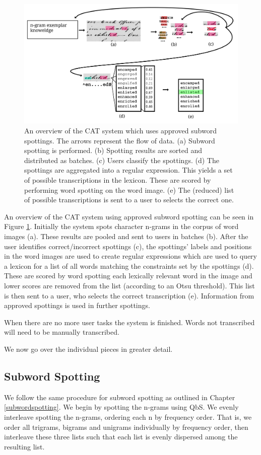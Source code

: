 \documentclass[ms,electronic,twosidetoc,letterpaper,chaptercenter,parttop,lof,lot]{byumsphd}
\begin{document}
\begin{figure}
    \centering
    \includegraphics[width=.9\textwidth]{flow6}
    \caption{An overview of the CAT system which uses approved subword spottings. The arrows represent the flow of data. (a) Subword spotting is performed. (b) Spotting results are sorted and distributed as batches. (c) Users classify the spottings. (d) The spottings are aggregated into a regular expression. This yields a set of possible transcriptions in the lexicon. These are scored by performing word spotting on the word image. (e) The (reduced) list of possible transcriptions is sent to a user to selects the correct one.}
    \label{fig:flow}
\end{figure}
An overview of the CAT system using approved subword spotting can be seen in Figure \ref{fig:flow}.  Initially the system spots character n-grams in the corpus of word images (a). These results are pooled and sent to users in batches (b). After the user identifies correct/incorrect spottings (c), the spottings' labels and positions in the word images are used to create regular expressions which are used to query a lexicon for a list of all words matching the constraints set by the spottings (d). These are scored by word spotting each lexically relevant word in the image and lower scores are removed from the list (according to an Otsu threshold). This list is then sent to a user, who selects the correct transcription (e). Information from approved spottings is used in further spottings.

When there are no more user tasks the system is finished. Words not transcribed will need to be manually transcribed.

We now go over the individual pieces in greater detail.

\subsection{Subword Spotting}
We follow the same procedure for subword spotting as outlined in Chapter \ref{subwordspotting}. We begin by spotting the n-grams using QbS. We evenly interleave spotting the n-grams, ordering each n by frequency order. That is, we order all trigrams, bigrams and unigrams individually by frequency order, then interleave these three lists such that each list is evenly dispersed among the resulting list. 
\end{document}
